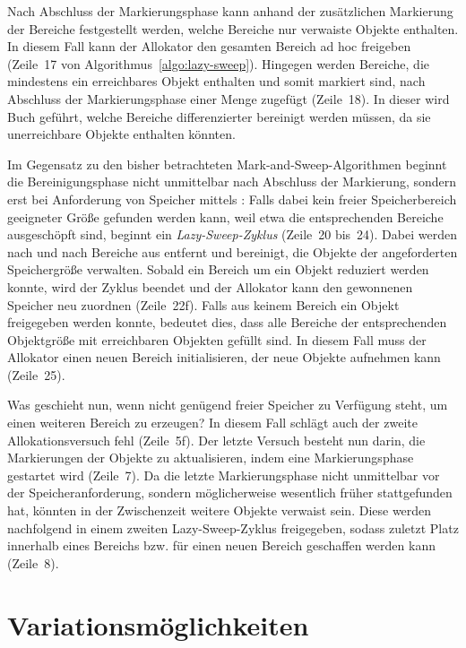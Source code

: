 Nach Abschluss der Markierungsphase kann anhand der zusätzlichen Markierung der Bereiche festgestellt werden, welche Bereiche nur verwaiste Objekte enthalten.
In diesem Fall kann der Allokator den gesamten Bereich ad hoc freigeben (Zeile~17 von Algorithmus~\ref{algo:lazy-sweep}).
Hingegen werden Bereiche, die mindestens ein erreichbares Objekt enthalten und somit markiert sind, nach Abschluss der Markierungsphase einer Menge  zugefügt (Zeile~18).
In dieser wird Buch geführt, welche Bereiche differenzierter bereinigt werden müssen, da sie unerreichbare Objekte enthalten könnten.

Im Gegensatz zu den bisher betrachteten Mark-and-Sweep-Algorithmen beginnt die Bereinigungsphase nicht unmittelbar nach Abschluss der Markierung, sondern erst bei Anforderung von Speicher mittels :
Falls dabei kein freier Speicherbereich geeigneter Größe gefunden werden kann, weil etwa die entsprechenden Bereiche ausgeschöpft sind, beginnt ein \textit{Lazy-Sweep-Zyklus} (Zeile~20 bis~24).
Dabei werden nach und nach Bereiche aus  entfernt und bereinigt, die Objekte der angeforderten Speichergröße verwalten.
Sobald ein Bereich um ein Objekt reduziert werden konnte, wird der Zyklus beendet und der Allokator kann den gewonnenen Speicher neu zuordnen (Zeile~22f).
Falls aus keinem Bereich ein Objekt freigegeben werden konnte, bedeutet dies, dass alle Bereiche der entsprechenden Objektgröße mit erreichbaren Objekten gefüllt sind.
In diesem Fall muss der Allokator einen neuen Bereich initialisieren, der neue Objekte aufnehmen kann (Zeile~25).

Was geschieht nun, wenn nicht genügend freier Speicher zu Verfügung steht, um einen weiteren Bereich zu erzeugen?
In diesem Fall schlägt auch der zweite Allokationsversuch fehl (Zeile~5f).
Der letzte Versuch besteht nun darin, die Markierungen der Objekte zu aktualisieren, indem eine Markierungsphase gestartet wird (Zeile~7).
Da die letzte Markierungsphase nicht unmittelbar vor der Speicheranforderung, sondern möglicherweise wesentlich früher stattgefunden hat, könnten in der Zwischenzeit weitere Objekte verwaist sein.
Diese werden nachfolgend in einem zweiten Lazy-Sweep-Zyklus freigegeben, sodass zuletzt Platz innerhalb eines Bereichs bzw. für einen neuen Bereich geschaffen werden kann (Zeile~8).



\section{Variationsmöglichkeiten}
\label{sec:variations}

